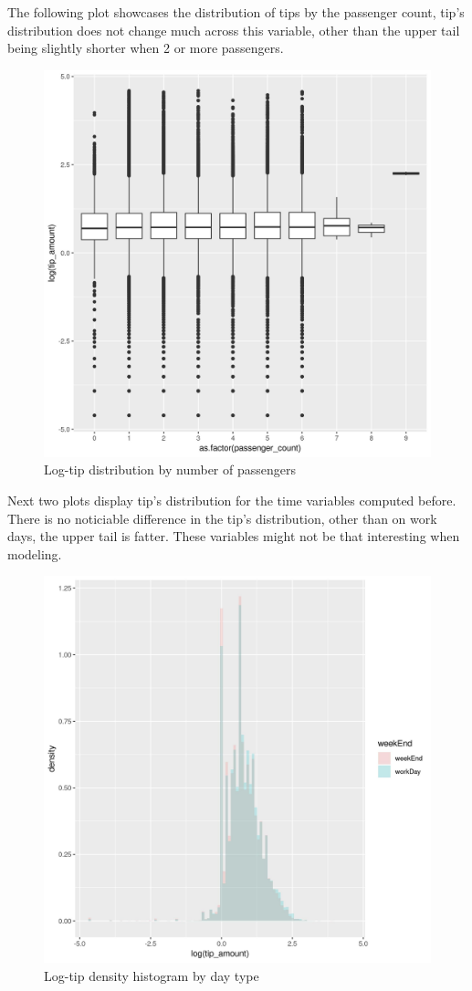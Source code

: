 \documentclass[11pt]{article}
\begin{document}
The following plot showcases the distribution of tips by the passenger
count, tip's distribution does not change much across this variable,
other than the upper tail being slightly shorter when 2 or more passengers.
\begin{figure}[htbp]
\centering
\includegraphics[width=.9\linewidth]{./plots/passengerTipBox.jpg}
\caption{\label{fig:org1eb71ca}
Log-tip distribution by number of passengers}
\end{figure}


Next two plots display tip's distribution for the time variables computed
before. There is no noticiable difference in the tip's distribution,
other than on work days, the upper tail is fatter. These variables might
not be that interesting when modeling.
\begin{figure}[htbp]
\centering
\includegraphics[width=.9\linewidth]{./plots/weekendTipDensityHist.jpg}
\caption{\label{fig:org3148d7c}
Log-tip density histogram by day type}
\end{figure}
\end{document}

